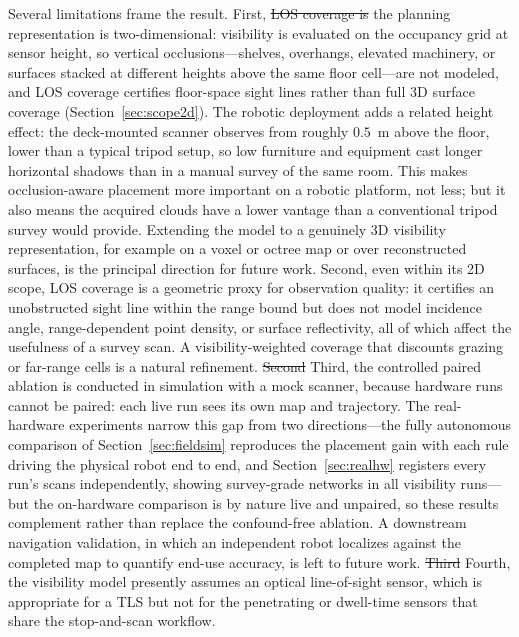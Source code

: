 \documentclass[sensors,article,submit,pdftex,moreauthors]{Definitions/mdpi}
\providecommand{\DIFadd}[1]{{\protect\color{blue} \sf #1}} %
\providecommand{\DIFdel}[1]{{\protect\color{red}\protect\scriptsize\protect\sout{#1}}} %
\providecommand{\DIFaddbegin}{} %
\providecommand{\DIFaddend}{} %
\providecommand{\DIFdelbegin}{} %
\providecommand{\DIFdelend}{} %
\begin{document}
Several limitations frame the result. First, \DIFdelbegin \DIFdel{LOS coverage is }\DIFdelend \DIFaddbegin \DIFadd{the planning representation is
two-dimensional: visibility is evaluated on the occupancy grid at sensor
height, so vertical occlusions---shelves, overhangs, elevated machinery, or
surfaces stacked at different heights above the same floor cell---are not
modeled, and LOS coverage certifies floor-space sight lines rather than full
3D surface coverage (Section~\ref{sec:scope2d}). The robotic deployment adds
a related height effect: the deck-mounted scanner observes from roughly
$0.5$~m above the floor, lower than a typical tripod setup, so low furniture
and equipment cast longer horizontal shadows than in a manual survey of the
same room. This makes occlusion-aware placement more important on a robotic
platform, not less; but it also means the acquired clouds have a lower vantage
than a conventional tripod survey would provide. Extending the model to a
genuinely 3D visibility representation, for example on a voxel or octree map
or over reconstructed surfaces, is the principal direction for future work.
Second, even within its 2D scope, LOS coverage is }\DIFaddend a geometric proxy
for observation quality: it certifies an unobstructed sight line within the range
bound but does not model incidence angle, range-dependent point density, or
surface reflectivity, all of which affect the usefulness of a survey scan. A
visibility-weighted coverage that discounts grazing or far-range cells is a
natural refinement. \DIFdelbegin \DIFdel{Second}\DIFdelend \DIFaddbegin \DIFadd{Third}\DIFaddend , the controlled paired ablation is conducted in
simulation with a mock scanner, because hardware runs cannot be paired: each
live run sees its own map and trajectory. The real-hardware experiments narrow
this gap from two directions---the fully autonomous comparison of
Section~\ref{sec:fieldsim} reproduces the placement gain with each rule driving
the physical robot end to end, and Section~\ref{sec:realhw} registers every
run's scans independently, showing survey-grade networks in all visibility
runs---but the on-hardware comparison is by nature live and unpaired, so these
results complement rather than replace the confound-free ablation. A downstream
navigation validation, in which an independent robot localizes against the
completed map to quantify end-use accuracy, is left to future work.
\DIFdelbegin \DIFdel{Third}\DIFdelend \DIFaddbegin \DIFadd{Fourth}\DIFaddend , the visibility model presently assumes an optical line-of-sight sensor,
which is
appropriate for a TLS but not for the penetrating or dwell-time sensors that
share the stop-and-scan workflow.
\end{document}
